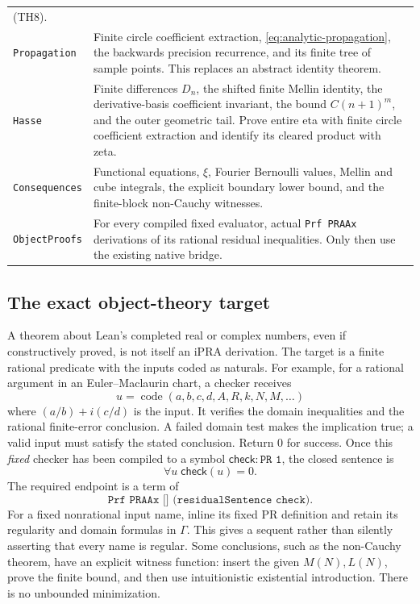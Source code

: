 \begin{longtable}{p{}p{}}
\textnormal{(TH8)}.\\
\texttt{Propagation} & Finite circle coefficient extraction,
\eqref{eq:analytic-propagation}, the backwards precision recurrence,
and its finite tree of sample points. This replaces an abstract
identity theorem.\\
\texttt{Hasse} & Finite differences $D_n$, the shifted finite Mellin
identity, the derivative-basis coefficient invariant, the bound
$C(n+1)^m$, and the outer geometric tail. Prove entire eta with finite
circle coefficient extraction and identify its cleared product with
zeta.\\
\texttt{Consequences} & Functional equations, $\xi$, Fourier Bernoulli
values, Mellin and cube integrals, the explicit boundary lower bound,
and the finite-block non-Cauchy witnesses.\\
\texttt{ObjectProofs} & For every compiled fixed evaluator, actual
\texttt{Prf PRAAx} derivations of its rational residual inequalities.
Only then use the existing native bridge.\\
\bottomrule
\end{longtable}

\subsection{The exact object-theory target}
A theorem about Lean's completed real or complex numbers, even if
constructively proved, is not itself an iPRA derivation. The target is a
finite rational predicate with the inputs coded as naturals. For example,
for a rational argument in an Euler--Maclaurin chart, a checker receives
\[
 u=\operatorname{code}(a,b,c,d,A,R,k,N,M,\ldots)
\]
where $(a/b)+i(c/d)$ is the input. It verifies the domain inequalities
and the rational finite-error conclusion. A failed domain test makes the
implication true; a valid input must satisfy the stated conclusion.
Return $0$ for success. Once this \emph{fixed} checker has been compiled
to a symbol $\mathsf{check}:\texttt{PR 1}$, the closed sentence is
\[
 \forall u\;\mathsf{check}(u)=0.
 \tag{L1}\label{eq:object-target}
\]
The required endpoint is a term of
\[
 \texttt{Prf PRAAx [] (residualSentence check)}.
 \tag{L2}\label{eq:object-proof}
\]
For a fixed nonrational input name, inline its fixed PR definition and
retain its regularity and domain formulas in $\Gamma$. This gives a
sequent rather than silently asserting that every name is regular.
Some conclusions, such as the non-Cauchy theorem, have an explicit
witness function: insert the given $M(N),L(N)$, prove the finite bound,
and then use intuitionistic existential introduction. There is no
unbounded minimization.

